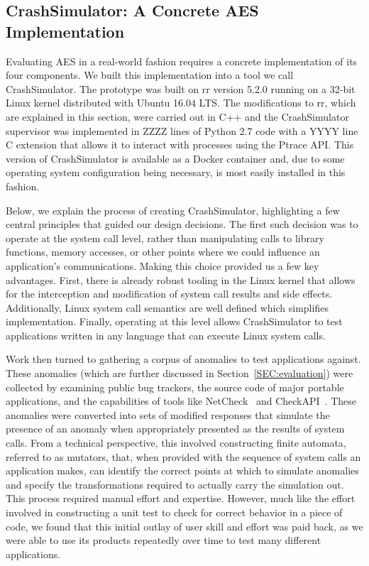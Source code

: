 \subsection{CrashSimulator: A Concrete AES Implementation}

Evaluating AES in a real-world fashion requires a
concrete implementation of its four components.
We built this implementation into a tool we call CrashSimulator.  The
prototype was built on rr version 5.2.0 running on a 32-bit Linux kernel
distributed with Ubuntu 16.04 LTS.  The modifications to rr, which are
explained in this section, were carried out in C++ and the CrashSimulator
supervisor was implemented in ZZZZ lines of Python 2.7 code with a YYYY
line C extension that allows it to interact with processes using the Ptrace
API.
This version of CrashSimulator is available as a Docker container and,
due to some operating system configuration being necessary, is most easily
installed in this fashion.

Below, we explain the process of creating CrashSimulator, highlighting a
few central principles that guided our design decisions. The first such
decision was to operate at the system call level, rather than manipulating
calls to library functions, memory accesses, or other points where we could
influence an application's communications. Making this choice provided us a
few key advantages. First, there is already robust tooling in the Linux
kernel that allows for the interception and modification of system call
results and side effects. Additionally, Linux system call semantics are
well defined which simplifies implementation. Finally, operating at this
level allows CrashSimulator to test applications written in any language
that can execute Linux system calls.

Work then turned to gathering a corpus of anomalies to test applications
against.  These anomalies (which are further discussed
in Section~\ref{SEC:evaluation})
were collected by examining public bug trackers,
the source code of major portable applications, and the capabilities of
tools like NetCheck~\cite{Zhuang_NSDI_2014}
and CheckAPI~\cite{rasley2015detecting}.  These anomalies were converted
into sets of modified responses
that simulate the presence of an anomaly when
appropriately presented as the results of system calls.
From a technical perspective, this involved constructing finite automata,
referred to as mutators, that, when provided with the sequence of system
calls an application makes, can identify the correct points at which to
simulate anomalies and specify the transformations required to actually
carry the simulation out.
This process required manual effort and expertise.
However,
much like
the effort involved in constructing a unit test to check for correct
behavior in a piece of code, we found that this initial outlay of
user skill and effort was paid back, as
we were able to use its products
repeatedly over time to test many different applications.

